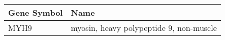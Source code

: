 \begin{tabular}{ll}
\toprule
Gene Symbol &                                    Name \\
\midrule
       MYH9 & myosin, heavy polypeptide 9, non-muscle \\
\bottomrule
\end{tabular}
